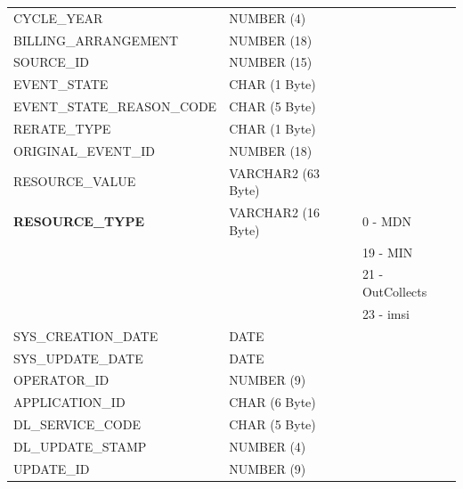 \documentclass[12pt,twoside]{article}
\begin{document}
\begin{longtable}{lll}
 CYCLE\_YEAR                             &  NUMBER (4)           &                            \\
 BILLING\_ARRANGEMENT                    &  NUMBER (18)          &                            \\
 SOURCE\_ID                              &  NUMBER (15)          &                            \\
 EVENT\_STATE                            &  CHAR (1 Byte)        &                            \\
 EVENT\_STATE\_REASON\_CODE              &  CHAR (5 Byte)        &                            \\
 RERATE\_TYPE                            &  CHAR (1 Byte)        &                            \\
 ORIGINAL\_EVENT\_ID                     &  NUMBER (18)          &                            \\
 RESOURCE\_VALUE                         &  VARCHAR2 (63 Byte)   &                            \\
 \textbf{RESOURCE\_TYPE}                 &  VARCHAR2 (16 Byte)   &  0  - MDN                  \\
                                         &                       &  19 - MIN                  \\
                                         &                       &  21 - OutCollects          \\
                                         &                       &  23 - imsi                 \\
 SYS\_CREATION\_DATE                     &  DATE                 &                            \\
 SYS\_UPDATE\_DATE                       &  DATE                 &                            \\
 OPERATOR\_ID                            &  NUMBER (9)           &                            \\
 APPLICATION\_ID                         &  CHAR (6 Byte)        &                            \\
 DL\_SERVICE\_CODE                       &  CHAR (5 Byte)        &                            \\
 DL\_UPDATE\_STAMP                       &  NUMBER (4)           &                            \\
 UPDATE\_ID                              &  NUMBER (9)           &                            \\

\end{longtable}
\end{document}
